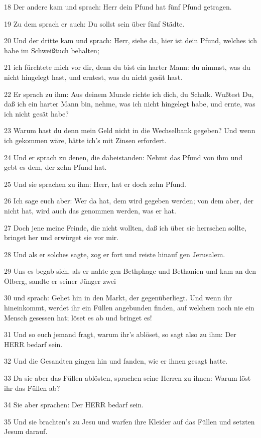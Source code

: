 \par 18 Der andere kam und sprach: Herr dein Pfund hat fünf Pfund getragen.
\par 19 Zu dem sprach er auch: Du sollst sein über fünf Städte.
\par 20 Und der dritte kam und sprach: Herr, siehe da, hier ist dein Pfund, welches ich habe im Schweißtuch behalten;
\par 21 ich fürchtete mich vor dir, denn du bist ein harter Mann: du nimmst, was du nicht hingelegt hast, und erntest, was du nicht gesät hast.
\par 22 Er sprach zu ihm: Aus deinem Munde richte ich dich, du Schalk. Wußtest Du, daß ich ein harter Mann bin, nehme, was ich nicht hingelegt habe, und ernte, was ich nicht gesät habe?
\par 23 Warum hast du denn mein Geld nicht in die Wechselbank gegeben? Und wenn ich gekommen wäre, hätte ich's mit Zinsen erfordert.
\par 24 Und er sprach zu denen, die dabeistanden: Nehmt das Pfund von ihm und gebt es dem, der zehn Pfund hat.
\par 25 Und sie sprachen zu ihm: Herr, hat er doch zehn Pfund.
\par 26 Ich sage euch aber: Wer da hat, dem wird gegeben werden; von dem aber, der nicht hat, wird auch das genommen werden, was er hat.
\par 27 Doch jene meine Feinde, die nicht wollten, daß ich über sie herrschen sollte, bringet her und erwürget sie vor mir.
\par 28 Und als er solches sagte, zog er fort und reiste hinauf gen Jerusalem.
\par 29 Uns es begab sich, als er nahte gen Bethphage und Bethanien und kam an den Ölberg, sandte er seiner Jünger zwei
\par 30 und sprach: Gehet hin in den Markt, der gegenüberliegt. Und wenn ihr hineinkommt, werdet ihr ein Füllen angebunden finden, auf welchem noch nie ein Mensch gesessen hat; löset es ab und bringet es!
\par 31 Und so euch jemand fragt, warum ihr's ablöset, so sagt also zu ihm: Der HERR bedarf sein.
\par 32 Und die Gesandten gingen hin und fanden, wie er ihnen gesagt hatte.
\par 33 Da sie aber das Füllen ablösten, sprachen seine Herren zu ihnen: Warum löst ihr das Füllen ab?
\par 34 Sie aber sprachen: Der HERR bedarf sein.
\par 35 Und sie brachten's zu Jesu und warfen ihre Kleider auf das Füllen und setzten Jesum darauf.
